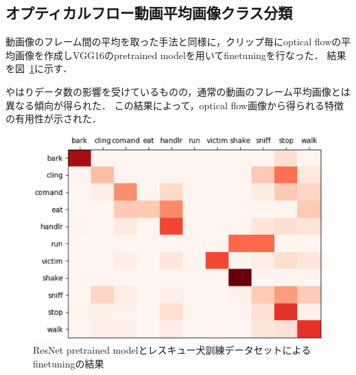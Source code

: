 \subsection{オプティカルフロー動画平均画像クラス分類}
動画像のフレーム間の平均を取った手法と同様に，クリップ毎にoptical flowの平均画像を作成しVGG16のpretrained modelを用いてfinetuningを行なった．
結果を図~\ref{sub_optresque_res}に示す．

やはりデータ数の影響を受けているものの，通常の動画のフレーム平均画像とは異なる傾向が得られた．
この結果によって，optical flow画像から得られる特徴の有用性が示された．
\begin{figure}[htbp]
  \begin{center}
    \includegraphics[scale=0.5]{./Figures/resque_optmean_result.eps}
    \caption{ResNet pretrained modelとレスキュー犬訓練データセットによるfinetuningの結果}
    \label{sub_optresque_res}
  \end{center}
\end{figure}
